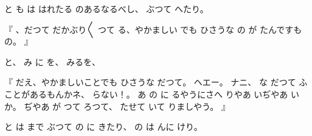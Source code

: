 と
も
は
はれたる
のあるなるべし、
ぶつて
へたり。

『
、だつて
だかぶり〳〵
つて
る、やかましい
でも
ひさうな
の
が
たんですもの。
』

と、
み
に
を、
みるを、

『
だえ、やかましいことでも
ひさうな
だつて。
ヘエー。
ナニ、
な
だつて
ふことがあるもんかネ、
らない！。
あ
の
に
るやうにさへ
りやあ
いぢやあ
いか。
ぢやあ
が
つて
ろつて、
たせて
いて
りましやう。
』

と
は
まで
ぶつて
の
に
きたり、
の
は
んに
けり。
